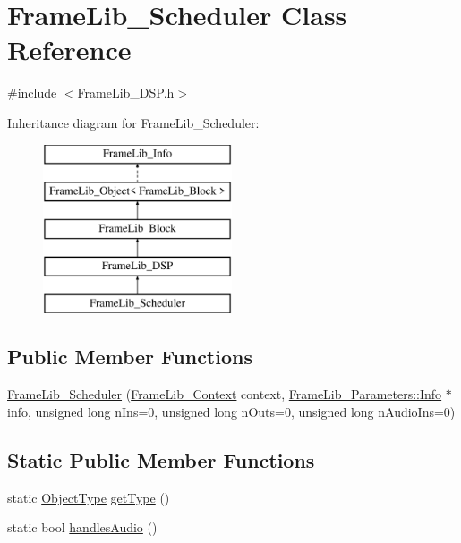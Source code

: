 \hypertarget{class_frame_lib___scheduler}{}\section{Frame\+Lib\+\_\+\+Scheduler Class Reference}
\label{class_frame_lib___scheduler}


{\ttfamily \#include $<$Frame\+Lib\+\_\+\+D\+S\+P.\+h$>$}

Inheritance diagram for Frame\+Lib\+\_\+\+Scheduler\+:\begin{figure}[H]
\begin{center}
\leavevmode
\includegraphics[height=5.000000cm]{class_frame_lib___scheduler}
\end{center}
\end{figure}
\subsection*{Public Member Functions}
\begin{DoxyCompactItemize}
\item 
\hyperlink{class_frame_lib___scheduler_a53005f7b96deb4074efcffecf1d39548}{Frame\+Lib\+\_\+\+Scheduler} (\hyperlink{class_frame_lib___context}{Frame\+Lib\+\_\+\+Context} context, \hyperlink{class_frame_lib___parameters_1_1_info}{Frame\+Lib\+\_\+\+Parameters\+::\+Info} $\ast$info, unsigned long n\+Ins=0, unsigned long n\+Outs=0, unsigned long n\+Audio\+Ins=0)
\end{DoxyCompactItemize}
\subsection*{Static Public Member Functions}
\begin{DoxyCompactItemize}
\item 
static \hyperlink{_frame_lib___types_8h_a842c5e2e69277690b064bf363c017980}{Object\+Type} \hyperlink{class_frame_lib___scheduler_a7d93c185e4d7b2d13852dad251dc769b}{get\+Type} ()
\item 
static bool \hyperlink{class_frame_lib___scheduler_a6ab661f5a92b9cc0096af2cde6c6f513}{handles\+Audio} ()
\end{DoxyCompactItemize}
